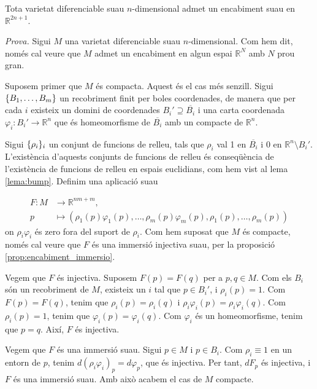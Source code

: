 \begin{teo}\label{teo:whitney}
    Tota varietat diferenciable suau $n$-dimensional admet un encabiment suau en $\mathbb R^{2n+1}$.
\end{teo}
{
    \color{black} \textit{Prova.}
    Sigui $M$ una varietat diferenciable suau $n$-dimensional. Com hem dit, només cal veure que $M$ admet un encabiment en algun espai $\mathbb R^N$ amb $N$ prou gran.

    Suposem primer que $M$ és compacta. Aquest és el cas més senzill. Sigui $\{B_1,\dots,B_m\}$ un recobriment finit per boles coordenades, de manera que per cada $i$ existeix un domini de coordenades $B_i'\supseteq \overline{B_i}$ i una carta coordenada $\varphi_i:B_i'\to\mathbb R^n$ que és homeomorfisme de $\overline{B_i}$ amb un compacte de $\mathbb R^n$.

    Sigui $\{\rho_i\}_i$ un conjunt de funcions de relleu, tals que $\rho_i$ val 1 en $\overline{B_i}$ i 0 en $\mathbb R^n\setminus B_i'$. L'existència d'aquests conjunts de funcions de relleu és conseqüència de l'existència de funcions de relleu en espais euclidians, com hem vist al lema \ref{lema:bump}. Definim una aplicació suau

    \begin{align*}
        F:M&\to\mathbb R^{nm + m},\\
        p&\mapsto \left(\rho_1(p)\varphi_1(p),\dots,\rho_m(p)\varphi_m(p), \rho_1(p),\dots,\rho_m(p)\right)
    \end{align*}
    on $\rho_i\varphi_i$ és zero fora del suport de $\rho_i$. Com hem suposat que $M$ és compacte, només cal veure que $F$ és una immersió injectiva suau, per la proposició \ref{prop:encabiment_immersio}.

    Vegem que $F$ és injectiva. Suposem $F(p) = F(q)$ per a $p,q\in M$. Com els $B_i$ són un recobriment de $M$, existeix un $i$ tal que $p\in B_i'$, i $\rho_i(p)=1$. Com $F(p) = F(q)$, tenim que $\rho_i(p) = \rho_i(q)$ i $\rho_i\varphi_i(p) = \rho_i\varphi_i(q)$. Com $\rho_i(p)=1$, tenim que $\varphi_i(p) = \varphi_i(q)$. Com $\varphi_i$ és un homeomorfisme, tenim que $p=q$. Així, $F$ és injectiva.

    Vegem que $F$ és una immersió suau. Sigui $p\in M$ i $p\in B_i$. Com $\rho_i\equiv1$ en un entorn de $p$, tenim $d(\rho_i\varphi_i)_p = d\varphi_p$, que és injectiva. Per tant, $dF_p$ és injectiva, i $F$ és una immersió suau.
    Amb això acabem el cas de $M$ compacte.

}
